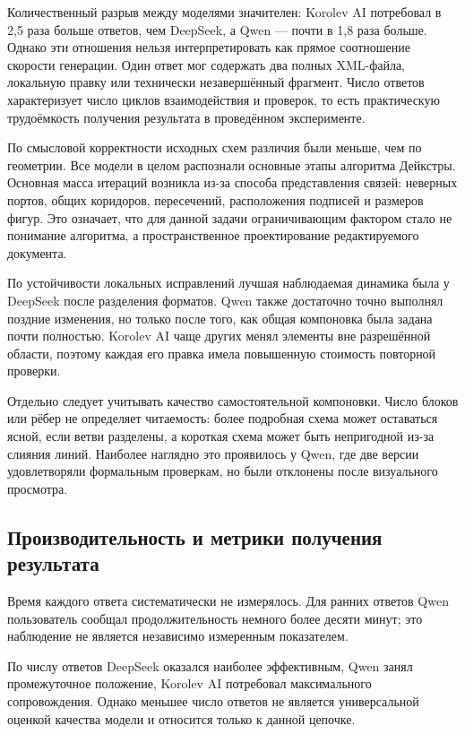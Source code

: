 \documentclass[a4paper,12pt]{extreport}
\begin{document}
Количественный разрыв между моделями значителен: Korolev AI потребовал в 2,5 раза больше ответов, чем DeepSeek, а Qwen --- почти в 1,8 раза больше. Однако эти отношения нельзя интерпретировать как прямое соотношение скорости генерации. Один ответ мог содержать два полных XML-файла, локальную правку или технически незавершённый фрагмент. Число ответов характеризует число циклов взаимодействия и проверок, то есть практическую трудоёмкость получения результата в проведённом эксперименте.

По смысловой корректности исходных схем различия были меньше, чем по геометрии. Все модели в целом распознали основные этапы алгоритма Дейкстры. Основная масса итераций возникла из-за способа представления связей: неверных портов, общих коридоров, пересечений, расположения подписей и размеров фигур. Это означает, что для данной задачи ограничивающим фактором стало не понимание алгоритма, а пространственное проектирование редактируемого документа.

По устойчивости локальных исправлений лучшая наблюдаемая динамика была у DeepSeek после разделения форматов. Qwen также достаточно точно выполнял поздние изменения, но только после того, как общая компоновка была задана почти полностью. Korolev AI чаще других менял элементы вне разрешённой области, поэтому каждая его правка имела повышенную стоимость повторной проверки.

Отдельно следует учитывать качество самостоятельной компоновки. Число блоков или рёбер не определяет читаемость: более подробная схема может оставаться ясной, если ветви разделены, а короткая схема может быть непригодной из-за слияния линий. Наиболее наглядно это проявилось у Qwen, где две версии удовлетворяли формальным проверкам, но были отклонены после визуального просмотра.

\subsection*{Производительность и метрики получения результата}

Время каждого ответа систематически не измерялось. Для ранних ответов Qwen пользователь сообщал продолжительность немного более десяти минут; это наблюдение не является независимо измеренным показателем.

По числу ответов DeepSeek оказался наиболее эффективным, Qwen занял промежуточное положение, Korolev AI потребовал максимального сопровождения. Однако меньшее число ответов не является универсальной оценкой качества модели и относится только к данной цепочке.
\end{document}
